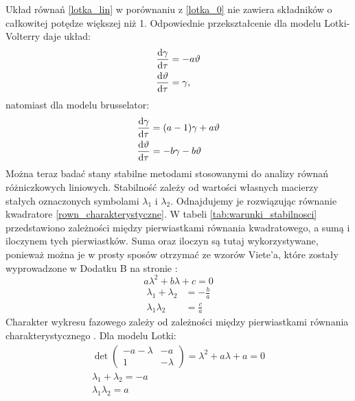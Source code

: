\documentclass[10pt, a4paper, twoside, onecolumn]{article}
\numberwithin{equation}{section}
\begin{document}
	Układ równań \eqref{lotka_lin} w porównaniu z \eqref{lotka_0} nie zawiera składników o całkowitej potędze większej niż 1. Odpowiednie przekształcenie dla modelu Lotki-Volterry daje układ:
	\begin{equation}\label{lotka_volterra_lin}
	\begin{split}
		\dv{\gamma}{\tau} &= -a\vartheta \\
		\dv{\vartheta}{\tau} &= \gamma,
	\end{split}
	\end{equation}
	natomiast dla modelu brusselator:
	\begin{equation}\label{bruskelator_lin}
	\begin{split}
		\dv{\gamma}{\tau} &= (a-1)\gamma+a\vartheta \\
		\dv{\vartheta}{\tau} &= -b\gamma-b\vartheta
	\end{split}
	\end{equation}
	Można teraz badać stany stabilne metodami stosowanymi do analizy równań różniczkowych liniowych. Stabilność zależy od wartości własnych macierzy stałych oznaczonych symbolami \(\lambda_{1}\) i \(\lambda_{2}\). Odnajdujemy je rozwiązując równanie kwadratore \eqref{rown_charakterystyczne}. W tabeli \ref{tab:warunki_stabilnosci} przedstawiono zależności między pierwiastkami równania kwadratowego, a sumą i iloczynem tych pierwiastków. Suma oraz iloczyn są tutaj wykorzystywane, ponieważ można je w prosty sposów otrzymać ze wzorów Viete'a, które zostały wyprowadzone w Dodatku B na stronie \pageref{sec: dodatek B}: 
	\begin{equation}\label{rown_charakterystyczne}
		a\lambda^{2} + b\lambda + c = 0
	\end{equation}
	\begin{equation}
	\begin{split}
		\lambda_{1} + \lambda_{2} &= -\frac{b}{a} \\
		\lambda_{1}\lambda_{2} &= \frac{c}{a}
	\end{split}
	\end{equation}
	Charakter wykresu fazowego zależy od zależności między pierwiastkami równania charakterystycznego \cite{orlik}.
	Dla modelu Lotki:
	\begin{equation}\label{lotka_charakterystyczne}
	\begin{split}
		\det
		\begin{pmatrix}
			-a-\lambda & -a \\
			1 & -\lambda
		\end{pmatrix}
		=\lambda^{2}+a\lambda+a=0 \\
		\lambda_{1}+\lambda_{2}=-a \\
		\lambda_{1}\lambda_{2}=a
	\end{split}
	\end{equation}
\end{document}
